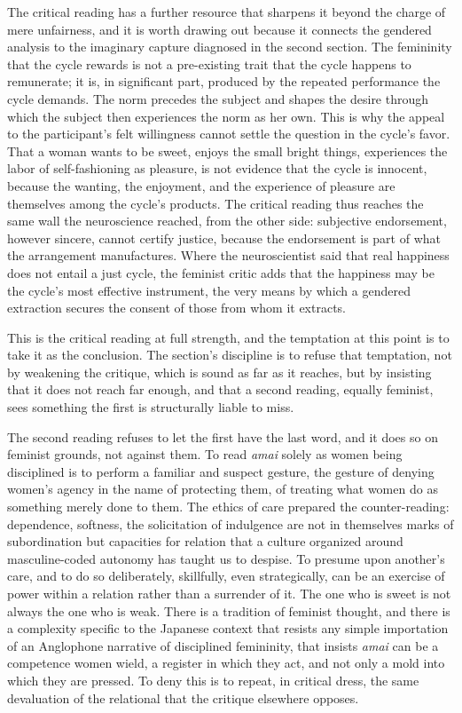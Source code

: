 \documentclass[11pt,a4paper]{article}
\begin{document}
The critical reading has a further resource that sharpens it beyond the charge of mere unfairness, and it is worth drawing out because it connects the gendered analysis to the imaginary capture diagnosed in the second section. The femininity that the cycle rewards is not a pre-existing trait that the cycle happens to remunerate; it is, in significant part, produced by the repeated performance the cycle demands. The norm precedes the subject and shapes the desire through which the subject then experiences the norm as her own. This is why the appeal to the participant's felt willingness cannot settle the question in the cycle's favor. That a woman wants to be sweet, enjoys the small bright things, experiences the labor of self-fashioning as pleasure, is not evidence that the cycle is innocent, because the wanting, the enjoyment, and the experience of pleasure are themselves among the cycle's products. The critical reading thus reaches the same wall the neuroscience reached, from the other side: subjective endorsement, however sincere, cannot certify justice, because the endorsement is part of what the arrangement manufactures. Where the neuroscientist said that real happiness does not entail a just cycle, the feminist critic adds that the happiness may be the cycle's most effective instrument, the very means by which a gendered extraction secures the consent of those from whom it extracts.

This is the critical reading at full strength, and the temptation at this point is to take it as the conclusion. The section's discipline is to refuse that temptation, not by weakening the critique, which is sound as far as it reaches, but by insisting that it does not reach far enough, and that a second reading, equally feminist, sees something the first is structurally liable to miss.

The second reading refuses to let the first have the last word, and it does so on feminist grounds, not against them. To read \textit{amai} solely as women being disciplined is to perform a familiar and suspect gesture, the gesture of denying women's agency in the name of protecting them, of treating what women do as something merely done to them. The ethics of care prepared the counter-reading: dependence, softness, the solicitation of indulgence are not in themselves marks of subordination but capacities for relation that a culture organized around masculine-coded autonomy has taught us to despise. To presume upon another's care, and to do so deliberately, skillfully, even strategically, can be an exercise of power within a relation rather than a surrender of it. The one who is sweet is not always the one who is weak. There is a tradition of feminist thought, and there is a complexity specific to the Japanese context that resists any simple importation of an Anglophone narrative of disciplined femininity, that insists \textit{amai} can be a competence women wield, a register in which they act, and not only a mold into which they are pressed. To deny this is to repeat, in critical dress, the same devaluation of the relational that the critique elsewhere opposes.
\end{document}
